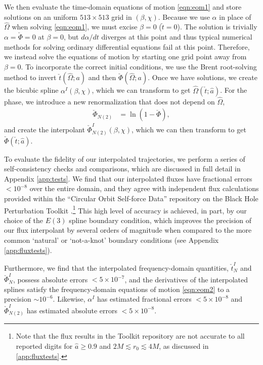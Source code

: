 \documentclass[%
 reprint,
 nofootinbib,
 amsmath,amssymb,
 aps,
 prd,
]{revtex4-2}
\begin{document}
We then evaluate the time-domain equations of motion \eqref{eqn:eom1} and store solutions on an uniform $513 \times 513$ grid in $(\beta, \chi)$. Because we use $\alpha$ in place of $\hat{\Omega}$ when solving \eqref{eqn:eom1}, we must excise $\beta = 0$ ($\check{t} = 0$). The solution is trivially $\alpha = \check{\Phi} = 0$ at $\beta = 0$, but $d\alpha/dt$ diverges at this point and thus typical numerical methods for solving ordinary differential equations fail at this point. Therefore, we instead solve the equations of motion by starting one grid point away from $\beta = 0$. To incorporate the correct initial conditions, we use the Brent root-solving method to invert $\check{t}(\hat{\Omega}; a)$ and then $\check{\Phi}(\hat{\Omega}; a)$. Once we have solutions, we create the bicubic spline $\alpha^I(\beta, \chi)$, which we can transform to get $\hat{\Omega}(\check{t}; \hat{a})$. For the phase, we introduce a new renormalization that does not depend on $\hat{\Omega}$,
\begin{align} \label{eqn:phaseNorm2}
    \check{\Phi}_{N(2)} &= \ln\left(1 - \check{\Phi} \right),
\end{align}
and create the interpolant $\check{\Phi}_{N(2)}^I(\beta, \chi)$, which we can then transform to get $\check{\Phi}(\check{t}; \hat{a})$.

To evaluate the fidelity of our interpolated trajectories, we perform a series of self-consistency checks and comparisons, which are discussed in full detail in Appendix \ref{app:tests}. We find that our interpolated fluxes have fractional errors $< 10^{-8}$ over the entire domain, and they agree with independent flux calculations \cite{TaraETC14, GralHughWarb16} provided within the ``Circular Orbit Self-force Data'' repository on the Black Hole Perturbation Toolkit \cite{BHPTK18}.\footnote{Note that the flux results in the Toolkit repository are not accurate to all reported digits for $\hat{a} \geq 0.9$ and $ 2M \lesssim r_0 \lesssim 4 M$, as discussed in \ref{app:fluxtests}.} This high level of accuracy is achieved, in part, by our choice of the $E(3)$ spline boundary condition, which improves the precision of our flux interpolant by several orders of magnitude when compared to the more common `natural' or `not-a-knot' boundary conditions (see Appendix \ref{app:fluxtests}). 

Furthermore, we find that the interpolated frequency-domain quantities, $\check{t}^I_N$ and $\check{\Phi}^I_N$, possess absolute errors $< 5\times 10^{-7}$, and the derivatives of the interpolated splines satisfy the frequency-domain equations of motion \eqref{eqn:eom2} to a precision $\sim 10^{-6}$. Likewise, $\alpha^I$ has estimated fractional errors $< 5\times 10^{-8}$ and $\check{\Phi}^I_{N(2)}$ has estimated absolute errors $< 5\times 10^{-8}$.
\end{document}
